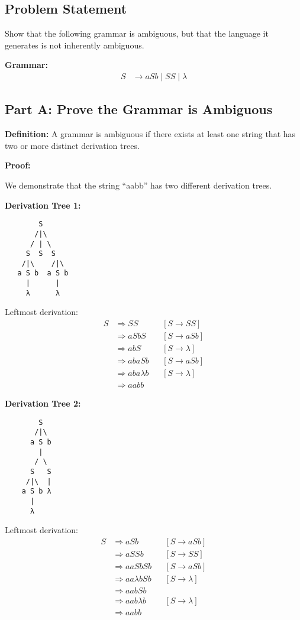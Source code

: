 \documentclass[12pt]{article}
\begin{document}
\subsection{Problem Statement}
Show that the following grammar is ambiguous, but that the language it generates is not inherently ambiguous.

\textbf{Grammar:}
\begin{align*}
S &\to aSb \mid SS \mid \lambda
\end{align*}

\subsection{Part A: Prove the Grammar is Ambiguous}

\textbf{Definition:} A grammar is ambiguous if there exists at least one string that has two or more distinct derivation trees.

\textbf{Proof:}

We demonstrate that the string ``aabb'' has two different derivation trees.

\textbf{Derivation Tree 1:}

\begin{verbatim}
        S
       /|\
      / | \
     S  S  S
    /|\    /|\
   a S b  a S b
     |      |
     λ      λ
\end{verbatim}

Leftmost derivation:
\begin{align*}
S &\Rightarrow SS             && [S \to SS] \\
  &\Rightarrow aSbS           && [S \to aSb] \\
  &\Rightarrow abS            && [S \to \lambda] \\
  &\Rightarrow abaSb          && [S \to aSb] \\
  &\Rightarrow aba\lambda b   && [S \to \lambda] \\
  &\Rightarrow aabb
\end{align*}

\textbf{Derivation Tree 2:}

\begin{verbatim}
        S
       /|\
      a S b
        |
       / \
      S   S
     /|\  |
    a S b λ
      |
      λ
\end{verbatim}

Leftmost derivation:
\begin{align*}
S &\Rightarrow aSb            && [S \to aSb] \\
  &\Rightarrow aSSb           && [S \to SS] \\
  &\Rightarrow aaSbSb         && [S \to aSb] \\
  &\Rightarrow aa\lambda bSb  && [S \to \lambda] \\
  &\Rightarrow aabSb          \\
  &\Rightarrow aab\lambda b   && [S \to \lambda] \\
  &\Rightarrow aabb
\end{align*}
\end{document}
